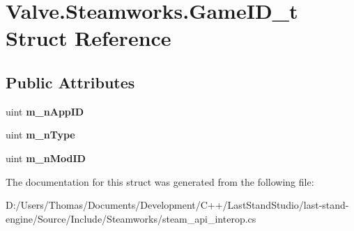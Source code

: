 \hypertarget{structValve_1_1Steamworks_1_1GameID__t}{}\section{Valve.\+Steamworks.\+Game\+I\+D\+\_\+t Struct Reference}
\label{structValve_1_1Steamworks_1_1GameID__t}
\subsection*{Public Attributes}
\begin{DoxyCompactItemize}
\item 
\hypertarget{structValve_1_1Steamworks_1_1GameID__t_a72bbcdbd700319b97b4eb08259d51ea2}{}uint {\bfseries m\+\_\+n\+App\+I\+D}\label{structValve_1_1Steamworks_1_1GameID__t_a72bbcdbd700319b97b4eb08259d51ea2}

\item 
\hypertarget{structValve_1_1Steamworks_1_1GameID__t_ac27f0791f89bd9ba5d463ccdf848be7d}{}uint {\bfseries m\+\_\+n\+Type}\label{structValve_1_1Steamworks_1_1GameID__t_ac27f0791f89bd9ba5d463ccdf848be7d}

\item 
\hypertarget{structValve_1_1Steamworks_1_1GameID__t_a5d7d47a10c8fdb34a57f31ffa1e8c80b}{}uint {\bfseries m\+\_\+n\+Mod\+I\+D}\label{structValve_1_1Steamworks_1_1GameID__t_a5d7d47a10c8fdb34a57f31ffa1e8c80b}

\end{DoxyCompactItemize}


The documentation for this struct was generated from the following file\+:\begin{DoxyCompactItemize}
\item 
D\+:/\+Users/\+Thomas/\+Documents/\+Development/\+C++/\+Last\+Stand\+Studio/last-\/stand-\/engine/\+Source/\+Include/\+Steamworks/steam\+\_\+api\+\_\+interop.\+cs\end{DoxyCompactItemize}
